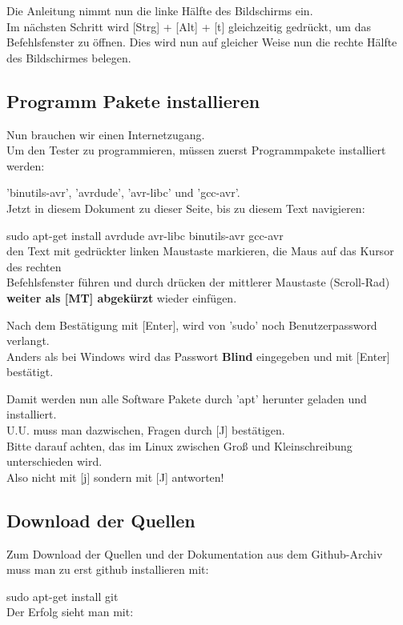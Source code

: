Die Anleitung nimmt nun die linke Hälfte des Bildschirms ein.
\\Im nächsten Schritt wird [Strg] + [Alt] + [t] gleichzeitig gedrückt, um das Befehlsfenster zu öffnen.
Dies wird nun auf gleicher Weise nun die rechte Hälfte des Bildschirmes belegen.\\

\subsection{Programm Pakete installieren}

Nun brauchen wir einen Internetzugang.
\\Um den Tester zu programmieren, müssen zuerst Programmpakete installiert werden:

'binutils-avr', 'avrdude', 'avr-libc' und 'gcc-avr'.
\\Jetzt in diesem Dokument zu dieser Seite, bis zu diesem Text navigieren:

sudo apt-get install avrdude avr-libc binutils-avr gcc-avr
\\den Text mit gedrückter linken Maustaste markieren, die Maus auf das Kursor des rechten
\\Befehlsfenster führen und durch drücken der mittlerer Maustaste (Scroll-Rad) \textbf{weiter als [MT] abgekürzt} wieder einfügen.
 
Nach dem Bestätigung mit [Enter], wird von 'sudo' noch Benutzerpassword verlangt.
\\Anders als bei Windows wird das Passwort \textbf{Blind} eingegeben und mit [Enter] bestätigt.

Damit werden nun alle Software Pakete durch 'apt' herunter geladen und installiert.\\
U.U. muss man dazwischen, Fragen durch [J] bestätigen.
\\Bitte darauf achten, das im Linux zwischen Groß und Kleinschreibung unterschieden wird.
\\Also nicht mit [j] sondern mit [J] antworten!

\subsection{Download der Quellen}

Zum Download der Quellen und der Dokumentation aus dem Github-Archiv muss man zu erst github installieren mit:

sudo apt-get install git\\
Der Erfolg sieht man mit:

